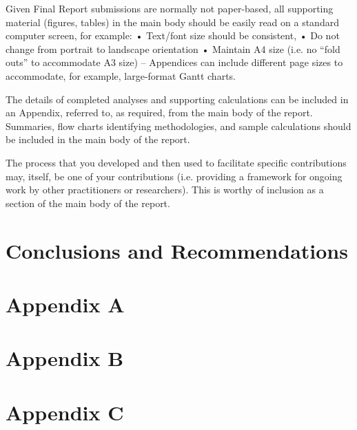 \documentclass[]{article}
\begin{document}
Given Final Report submissions are normally not paper-based, all supporting material (figures, tables) in the main body should be easily read on a standard computer screen, for example:
•	Text/font size should be consistent, 
•	Do not change from portrait to landscape orientation 
•	Maintain A4 size (i.e. no “fold outs” to accommodate A3 size) – Appendices can include different page sizes to accommodate, for example, large-format Gantt charts.

The details of completed analyses and supporting calculations can be included in an Appendix, referred to, as required, from the main body of the report.  Summaries, flow charts identifying methodologies, and sample calculations should be included in the main body of the report.

The process that you developed and then used to facilitate specific contributions may, itself, be one of your contributions (i.e. providing a framework for ongoing work by other practitioners or researchers).  This is worthy of inclusion as a section of the main body of the report.
\color{black}

\section{Conclusions and Recommendations}


\newpage


\appendix
\newpage
\section*{Appendix A}


\newpage
\section*{Appendix B}


\section*{Appendix C}

\end{document}

